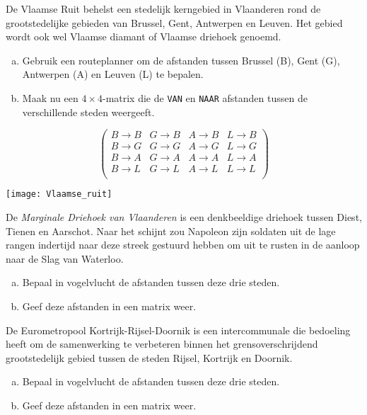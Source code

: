 \documentclass[12pt,twoside]{article}
\begin{document}
\begin{oefening}
De Vlaamse Ruit behelst een stedelijk kerngebied in Vlaanderen rond de grootstedelijke gebieden van Brussel, Gent, Antwerpen en Leuven. Het gebied wordt ook wel Vlaamse diamant of Vlaamse driehoek genoemd.\\
\begin{minipage}{0.5\textwidth}
\begin{enumerate}[(a)]
  \item Gebruik een routeplanner om de afstanden tussen Brussel (B), Gent (G), Antwerpen (A) en Leuven (L) te bepalen.
  \item Maak nu een $4 \times 4$-matrix die de \verb#VAN# en \verb#NAAR# afstanden tussen de verschillende steden weergeeft.
\end{enumerate}
$$\begin{pmatrix}
  B\to B & G\to B & A\to B & L\to B\\
  B\to G & G\to G & A\to G & L\to G\\
  B\to A & G\to A & A\to A & L\to A\\
  B\to L & G\to L & A\to L & L\to L\\
\end{pmatrix}$$
\end{minipage}
\begin{minipage}{0.5\textwidth}
\begin{center}
\texttt{[image: Vlaamse\_ruit]}
\end{center}
\end{minipage}
\end{oefening}

\begin{oefening}
De {\em Marginale Driehoek van Vlaanderen} is een denkbeeldige driehoek tussen Diest, Tienen en Aarschot. Naar het schijnt zou Napoleon zijn soldaten uit de lage rangen indertijd naar deze streek gestuurd hebben om uit te rusten in de aanloop naar de Slag van Waterloo.
\begin{enumerate}[(a)]
  \item Bepaal in vogelvlucht de afstanden tussen deze drie steden.
  \item Geef deze afstanden in een matrix weer.
\end{enumerate}
\end{oefening}

\begin{oefening}
De Eurometropool Kortrijk-Rijsel-Doornik is een intercommunale die bedoeling heeft om de samenwerking te verbeteren binnen het grensoverschrijdend grootstedelijk gebied tussen de steden Rijsel, Kortrijk en Doornik.
\begin{enumerate}[(a)]
  \item Bepaal in vogelvlucht de afstanden tussen deze drie steden.
  \item Geef deze afstanden in een matrix weer.
\end{enumerate}
\end{oefening}
\end{document}
